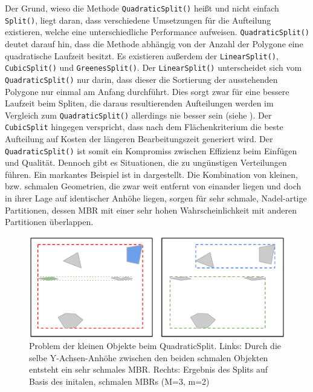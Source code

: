 \documentclass[runningheads,a4paper]{llncs}
\begin{document}
	Der Grund, wieso die Methode \texttt{QuadraticSplit()} heißt und nicht einfach \texttt{Split()}, liegt daran, dass verschiedene Umsetzungen für die Aufteilung existieren, welche eine unterschiedliche Performance aufweisen. \texttt{QuadraticSplit()} deutet darauf hin, dass die Methode abhängig von der Anzahl der Polygone eine quadratische Laufzeit besitzt. Es existieren außerdem der \texttt{LinearSplit()}, \texttt{CubicSplit()} und \texttt{GreenesSplit()}. Der \texttt{LinearSplit()} unterscheidet sich vom \texttt{QuadraticSplit()} nur darin, dass dieser die Sortierung der ausstehenden Polygone nur einmal am Anfang durchführt. Dies sorgt zwar für eine bessere Laufzeit beim Spliten, die daraus resultierenden Aufteilungen werden im Vergleich zum \texttt{QuadraticSplit()} allerdings nie besser sein (siehe ). Der \texttt{CubicSplit} hingegen verspricht, dass nach dem Flächenkriterium die beste Aufteilung auf Kosten der längeren Bearbeitungszeit generiert wird. Der \texttt{QuadraticSplit()} ist somit ein Kompromiss zwischen Effizienz beim Einfügen und Qualität. Dennoch gibt es Situationen, die zu ungünstigen Verteilungen führen. Ein markantes Beispiel ist in  dargestellt. Die Kombination von kleinen, bzw. schmalen Geometrien, die zwar weit entfernt von einander liegen und doch in ihrer Lage auf identischer Anhöhe liegen, sorgen für sehr schmale, Nadel-artige Partitionen, dessen \acs{MBR} mit einer sehr hohen Wahrscheinlichkeit mit anderen Partitionen überlappen.
	\begin{figure}[H]
		\begin{center}
		\includegraphics[width=1.0\textwidth ]{004_Problem_Kleine_Objekte.pdf}
		\caption{Problem der kleinen Objekte beim QuadraticSplit. Links: Durch die selbe Y-Achsen-Anhöhe zwischen den beiden schmalen Objekten entsteht ein sehr schmales \acs{MBR}. Rechts: Ergebnis des Splits auf Basis des initalen, schmalen \acs{MBR}s (\acs{M}=3, \acs{m}=2)}
		\label{fig:problem-tiny-object}
		\end{center}
	\end{figure}
\end{document}
